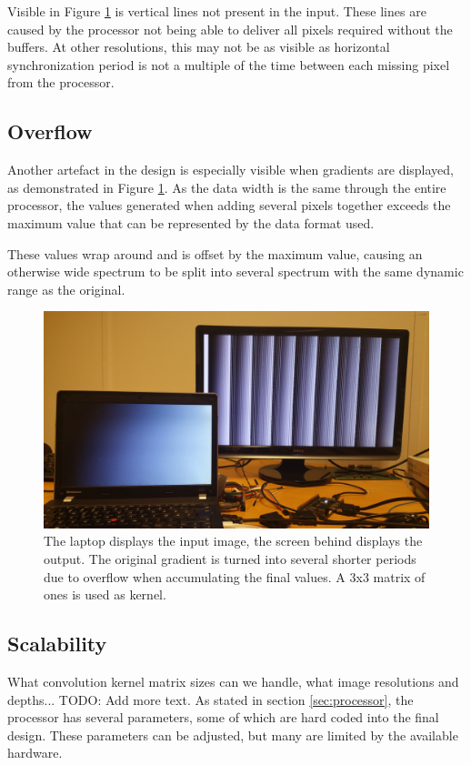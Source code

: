 Visible in Figure \ref{fig:Overflow} is vertical lines not present in the input.
These lines are caused by the processor not being able to deliver all pixels required without the buffers.
At other resolutions, this may not be as visible as horizontal synchronization period is not a multiple of the time between each missing pixel from the processor.

\subsection{Overflow}
Another artefact in the design is especially visible when gradients are displayed, as demonstrated in Figure \ref{fig:Overflow}.
As the data width is the same through the entire processor, the values generated when adding several pixels together exceeds the maximum value that can be represented by the data format used.

These values wrap around and is offset by the maximum value, causing an otherwise wide spectrum to be split into several spectrum with the same dynamic range as the original.

\begin{figure}
    \centering
    \includegraphics[width=14cm]{img/gradient_test}
    \caption{
        The laptop displays the input image, the screen behind displays the output.
        The original gradient is turned into several shorter periods due to overflow when accumulating the final values.
        A 3x3 matrix of ones is used as kernel.
    }
    \label{fig:Overflow}

\end{figure}

\subsection{Scalability}
What convolution kernel matrix sizes can we handle, what image resolutions and depths... TODO: Add more text.
As stated in section \ref{sec:processor}, the processor has several parameters, some of which are hard coded into the final design.
These parameters can be adjusted, but many are limited by the available hardware.

